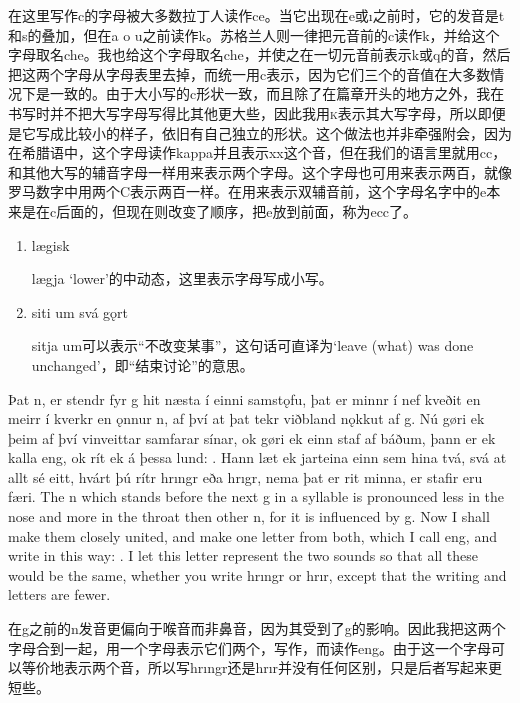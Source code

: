 \begin{translation*}{}
    在这里写作c的字母被大多数拉丁人读作ce。当它出现在e或ı之前时，它的发音是t和s的叠加，但在a o u之前读作k。苏格兰人则一律把元音前的c读作k，并给这个字母取名che。我也给这个字母取名che，并使之在一切元音前表示k或q的音，然后把这两个字母从字母表里去掉，而统一用c表示，因为它们三个的音值在大多数情况下是一致的。由于大小写的c形状一致，而且除了在篇章开头的地方之外，我在书写时并不把大写字母写得比其他更大些，因此我用\textsc{k}表示其大写字母，所以即便是它写成比较小的样子，依旧有自己独立的形状。这个做法也并非牵强附会，因为在希腊语中，这个字母读作kappa并且表示xx这个音，但在我们的语言里就用cc，和其他大写的辅音字母一样用来表示两个字母。这个字母也可用来表示两百，就像罗马数字中用两个C表示两百一样。在用来表示双辅音前，这个字母名字中的e本来是在c后面的，但现在则改变了顺序，把e放到前面，称为ecc了。
\end{translation*}
\begin{grammar*}{}
    \begin{enumerate}[leftmargin=*]
        \item lægisk

              lægja `lower'的中动态，这里表示字母写成小写。

        \item siti um svá gǫrt

              sitja um可以表示“不改变某事”，这句话可直译为`leave (what) was done unchanged'，即“结束讨论”的意思。
    \end{enumerate}
\end{grammar*}
\begin{paracol}{2}
    Þat n, er stendr fyr g hit næsta í einni samstǫfu, þat er minnr í nef kveðit en meirr í kverkr en ǫnnur n, af því at þat tekr viðbland nǫkkut af g. Nú gøri ek þeim af því vinveittar samfarar sínar, ok gøri ek einn staf af báðum, þann er ek kalla eng, ok rít ek á þessa lund: \textcrg . Hann læt ek jarteina einn sem hina tvá, svá at allt sé eitt, hvárt þú rítr hrıngr eða hrıgr, nema þat er rit minna, er stafir eru færi.
    \switchcolumn
    The n which stands before the next g in a syllable is pronounced less in the nose and more in the throat then other n, for it is influenced by g. Now I shall make them closely united, and make one letter from both, which I call eng, and write in this way: \textcrg . I let this letter represent the two sounds so that all these would be the same, whether you write hrıngr or hrı\textcrg r, except that the writing and letters are fewer.
\end{paracol}
\begin{translation*}{}
    在g之前的n发音更偏向于喉音而非鼻音，因为其受到了g的影响。因此我把这两个字母合到一起，用一个字母表示它们两个，写作\textcrg ，而读作eng。由于这一个字母可以等价地表示两个音，所以写hrıngr还是hrı\textcrg r并没有任何区别，只是后者写起来更短些。
\end{translation*}

